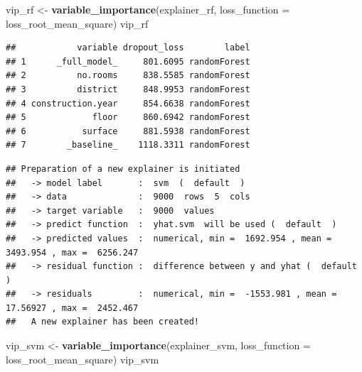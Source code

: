 \documentclass[12pt,]{krantz}
\newenvironment{Shaded}{\begin{snugshade}}{\end{snugshade}}
\newcommand{\DataTypeTok}[1]{\textcolor[rgb]{0.13,0.29,0.53}{#1}}
\newcommand{\DecValTok}[1]{\textcolor[rgb]{0.00,0.00,0.81}{#1}}
\newcommand{\KeywordTok}[1]{\textcolor[rgb]{0.13,0.29,0.53}{\textbf{#1}}}
\newcommand{\NormalTok}[1]{#1}
\newcommand{\OperatorTok}[1]{\textcolor[rgb]{0.81,0.36,0.00}{\textbf{#1}}}
\newcommand{\OtherTok}[1]{\textcolor[rgb]{0.56,0.35,0.01}{#1}}
\newcommand{\StringTok}[1]{\textcolor[rgb]{0.31,0.60,0.02}{#1}}
\begin{document}
\begin{Shaded}
\begin{Highlighting}[]
\NormalTok{vip_rf <-}\StringTok{ }\KeywordTok{variable_importance}\NormalTok{(explainer_rf, }
            \DataTypeTok{loss_function =}\NormalTok{ loss_root_mean_square)}
\NormalTok{vip_rf}
\end{Highlighting}
\end{Shaded}

\begin{verbatim}
##            variable dropout_loss        label
## 1      _full_model_     801.6095 randomForest
## 2          no.rooms     838.5585 randomForest
## 3          district     848.9953 randomForest
## 4 construction.year     854.6638 randomForest
## 5             floor     860.6942 randomForest
## 6           surface     881.5938 randomForest
## 7        _baseline_    1118.3311 randomForest
\end{verbatim}

\begin{Shaded}
\end{Shaded}

\begin{verbatim}
## Preparation of a new explainer is initiated
##   -> model label       :  svm  (  default  )
##   -> data              :  9000  rows  5  cols 
##   -> target variable   :  9000  values 
##   -> predict function  :  yhat.svm  will be used (  default  )
##   -> predicted values  :  numerical, min =  1692.954 , mean =  3493.954 , max =  6256.247  
##   -> residual function :  difference between y and yhat (  default  )
##   -> residuals         :  numerical, min =  -1553.981 , mean =  17.56927 , max =  2452.467  
##   A new explainer has been created!
\end{verbatim}

\begin{Shaded}
\begin{Highlighting}[]
\NormalTok{vip_svm <-}\StringTok{ }\KeywordTok{variable_importance}\NormalTok{(explainer_svm, }
            \DataTypeTok{loss_function =}\NormalTok{ loss_root_mean_square)}
\NormalTok{vip_svm}
\end{Highlighting}
\end{Shaded}
\end{document}
